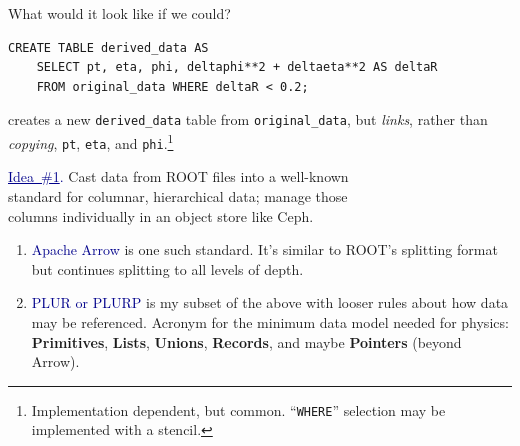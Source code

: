 \documentclass[aspectratio=169]{beamer}
\begin{document}
\begin{frame}[fragile]{What would it look like if we could?}
\begin{verbatim}
CREATE TABLE derived_data AS
    SELECT pt, eta, phi, deltaphi**2 + deltaeta**2 AS deltaR
    FROM original_data WHERE deltaR < 0.2;
\end{verbatim}

creates a new {\tt derived\_data} table from {\tt original\_data}, but {\it links}, rather than {\it copying}, {\tt pt}, {\tt eta}, and {\tt phi}.\footnote{Implementation dependent, but common. ``{\tt WHERE}'' selection may be implemented with a stencil.}

\vspace{0.25 cm}

\vspace{0.5 cm}

\vspace{0.25 cm}
\end{frame}

\begin{frame}{}
\vspace{1 cm}
\begin{center}
\Large \textcolor{darkblue}{\underline{Idea~\#1}.} Cast data from ROOT files into a well-known \\ standard for columnar, hierarchical data; manage those \\ columns individually in an object store like Ceph.
\end{center}

\begin{enumerate}
\item<2-> \textcolor{darkblue}{Apache Arrow} is one such standard. It's similar to ROOT's splitting format but continues splitting to all levels of depth.
\item<3-> \textcolor{darkblue}{PLUR or PLURP} is my subset of the above with looser rules about how data may be referenced. Acronym for the minimum data model needed for physics: {\bf Primitives}, {\bf Lists}, {\bf Unions}, {\bf Records}, and maybe {\bf Pointers} (beyond Arrow).
\end{enumerate}

\begin{center}
\end{center}
\end{frame}
\end{document}
